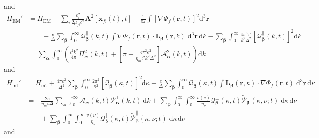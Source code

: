 \documentclass{article}
\begin{document}
and 
\begin{equation}
\begin{split}\label{eq:HEM2}
H_\mathrm{EM}' &= H_\mathrm{EM} - \sum_i\frac{e_i^2}{2\mu_{fi}c^2}\mathbf{A}^2[\mathbf{x}_{fi}(t),t] - \frac{1}{8\pi}\int\left[\nabla\Phi_f(\mathbf{r},t)\right]^2\mathrm{d}^3\mathbf{r}\\
&\qquad - \frac{e}{\Delta}\sum_{\bm{\beta}}\int_0^\infty\mathcal{Q}_{\bm{\beta}}^\parallel(k,t)\int\nabla\Phi_f(\mathbf{r},t)\cdot\mathbf{L}_{\bm{\beta}}(\mathbf{r},k)\;\mathrm{d}^3\mathbf{r}\,\mathrm{d}k - \sum_{\bm{\beta}}\int_0^\infty\frac{4\pi^3e^2}{k^2\Delta^2}\left[\mathcal{Q}_{\bm{\beta}}^\parallel(k,t)\right]^2\mathrm{d}k\\
&= \sum_{\bm{\alpha}}\int_0^\infty\left(\frac{c^2k^2}{4\pi}\mathit{\Pi}_{\bm{\alpha}}^2(k,t) + \left[\pi + \frac{4\pi^2e^2}{\eta_mc^2k^2\Delta^2}\right]\mathcal{A}_{\bm{\alpha}}^2(k,t)\right)\mathrm{d}k
\end{split}
\end{equation}
and
\begin{equation}
\begin{split}
H_\mathrm{int}' &= H_\mathrm{int} + \frac{4\pi e^2}{\Delta^2}\sum_{\bm{\beta}}\int_0^\infty\frac{2\pi^2}{\kappa^2}\left[\mathcal{Q}_{\bm{\beta}}^\parallel(\kappa,t)\right]^2\mathrm{d}\kappa + \frac{e}{\Delta}\sum_{\bm{\beta}}\int_0^\infty\mathcal{Q}_{\bm{\beta}}^\parallel(\kappa,t)\int\mathbf{L}_{\bm{\beta}}(\mathbf{r},\kappa)\cdot\nabla\Phi_f(\mathbf{r},t)\;\mathrm{d}^3\mathbf{r}\,\mathrm{d}\kappa\\
&= -\frac{2e}{\eta_mc\Delta}\sum_{\bm{\alpha}}\int_0^\infty\mathcal{A}_{\bm{\alpha}}(k,t)\mathcal{P}_{\bm{\alpha}}^\perp(k,t)\;\mathrm{d}k + \sum_{\bm{\beta}}\int_0^\infty\int_0^\infty\frac{\tilde{v}(\nu)}{\eta_\nu}\mathcal{Q}_{\bm{\beta}}^\perp(\kappa,t)\tilde{\mathcal{P}}_{\bm{\beta}}^\perp(\kappa,\nu;t)\;\mathrm{d}\kappa\,\mathrm{d}\nu\\
&\qquad + \sum_{\bm{\beta}}\int_0^\infty\int_0^\infty\frac{\tilde{v}(\nu)}{\eta_\nu}\mathcal{Q}_{\bm{\beta}}^\parallel(\kappa,t)\tilde{\mathcal{P}}_{\bm{\beta}}^\parallel(\kappa,\nu;t)\;\mathrm{d}\kappa\,\mathrm{d}\nu
\end{split}
\end{equation}
and
\end{document}
